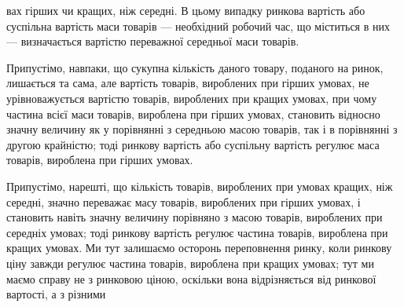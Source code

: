 вах гірших чи кращих, ніж середні. В цьому випадку ринкова
вартість або суспільна вартість маси товарів — необхідний робочий час, що міститься в них —
визначається вартістю переважної середньої маси товарів.

Припустімо, навпаки, що сукупна кількість даного товару,
поданого на ринок, лишається та сама, але вартість товарів,
вироблених при гірших умовах, не урівноважується вартістю
товарів, вироблених при кращих умовах, при чому частина всієї
маси товарів, вироблена при гірших умовах, становить відносно
значну величину як у порівнянні з середньою масою товарів,
так і в порівнянні з другою крайністю; тоді ринкову вартість
або суспільну вартість регулює маса товарів, вироблена при
гірших умовах.

Припустімо, нарешті, що кількість товарів, вироблених при
умовах кращих, ніж середні, значно переважає масу товарів, вироблених при гірших умовах, і становить
навіть значну величину порівняно з масою товарів, вироблених при середніх умовах; тоді ринкову
вартість регулює частина товарів, вироблена при
кращих умовах. Ми тут залишаємо осторонь переповнення ринку,
коли ринкову ціну завжди регулює частина товарів, вироблена
при кращих умовах; тут ми маємо справу не з ринковою ціною,
оскільки вона відрізняється від ринкової вартості, а з різними
